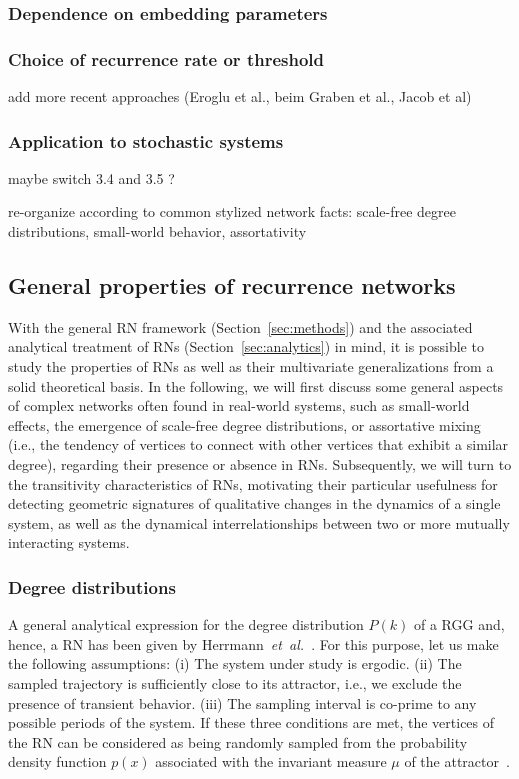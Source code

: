 		\subsubsection{Dependence on embedding parameters}
		\subsubsection{Choice of recurrence rate or threshold}
        
        add more recent approaches (Eroglu et al., beim Graben et al., Jacob et al)
        
		\subsubsection{Application to stochastic systems}

maybe switch 3.4 and 3.5 ?

re-organize according to common stylized network facts: scale-free degree
distributions, small-world behavior, assortativity 

	\subsection{General properties of recurrence networks}
		
With the general RN framework (Section~\ref{sec:methods}) and the associated analytical treatment of RNs (Section~\ref{sec:analytics}) in mind, it is possible to study the properties of RNs as well as their multivariate generalizations from a solid theoretical basis. In the following, we will first discuss some general aspects of complex networks often found in real-world systems, such as small-world effects, the emergence of scale-free degree distributions, or assortative mixing (i.e., the tendency of vertices to connect with other vertices that exhibit a similar degree), regarding their presence or absence in RNs. Subsequently, we will turn to the transitivity characteristics of RNs, motivating their particular usefulness for detecting geometric signatures of qualitative changes in the dynamics of a single system, as well as the dynamical interrelationships between two or more mutually interacting systems.

        
        \subsubsection{Degree distributions} 

A general analytical expression for the degree distribution $P(k)$ of a RGG and, hence, a RN has been given by Herrmann~\textit{et~al.}~\cite{Herrmann2003}. For this purpose, let us make the following assumptions: (i) The system under study is ergodic. (ii) The sampled trajectory is sufficiently close to its attractor, i.e., we exclude the presence of transient behavior. (iii) The sampling interval is co-prime to any possible periods of the system. If these three conditions are met, the vertices of the RN can be considered as being randomly sampled from the probability density function $p(x)$ associated with the invariant measure $\mu$ of the attractor~\cite{Eckmann1985}. 


